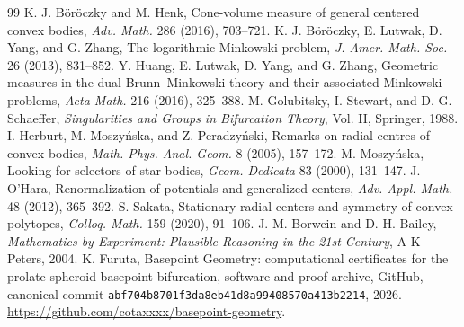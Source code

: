 \documentclass[11pt]{article}
\begin{document}
\begin{thebibliography}{99}
 K. J. B\"or\"oczky and M. Henk, Cone-volume measure of general centered convex bodies, \emph{Adv. Math.} 286 (2016), 703--721.
 K. J. B\"or\"oczky, E. Lutwak, D. Yang, and G. Zhang, The logarithmic Minkowski problem, \emph{J. Amer. Math. Soc.} 26 (2013), 831--852.
 Y. Huang, E. Lutwak, D. Yang, and G. Zhang, Geometric measures in the dual Brunn--Minkowski theory and their associated Minkowski problems, \emph{Acta Math.} 216 (2016), 325--388.
 M. Golubitsky, I. Stewart, and D. G. Schaeffer, \emph{Singularities and Groups in Bifurcation Theory}, Vol. II, Springer, 1988.
 I. Herburt, M. Moszy\'nska, and Z. Peradzy\'nski, Remarks on radial centres of convex bodies, \emph{Math. Phys. Anal. Geom.} 8 (2005), 157--172.
 M. Moszy\'nska, Looking for selectors of star bodies, \emph{Geom. Dedicata} 83 (2000), 131--147.
 J. O'Hara, Renormalization of potentials and generalized centers, \emph{Adv. Appl. Math.} 48 (2012), 365--392.
 S. Sakata, Stationary radial centers and symmetry of convex polytopes, \emph{Colloq. Math.} 159 (2020), 91--106.
 J. M. Borwein and D. H. Bailey, \emph{Mathematics by Experiment: Plausible Reasoning in the 21st Century}, A K Peters, 2004.
 K. Furuta, Basepoint Geometry: computational certificates for the prolate-spheroid basepoint bifurcation, software and proof archive, GitHub, canonical commit \texttt{abf704b8701f3da8eb41d8\allowbreak a99408570a413b2214}, 2026. \url{https://github.com/cotaxxxx/basepoint-geometry}.
\end{thebibliography}
\end{document}
